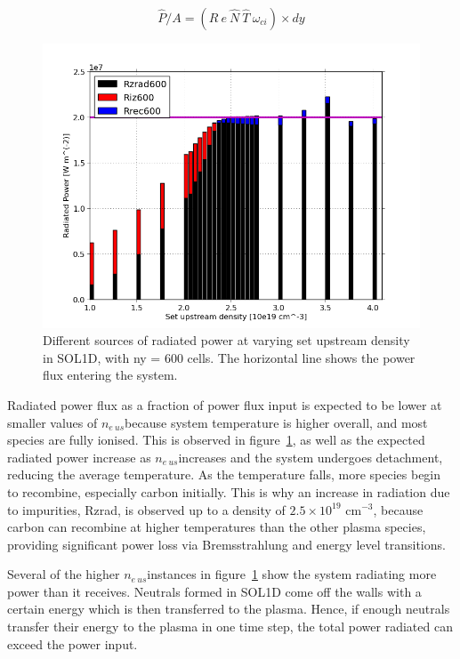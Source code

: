 \documentclass[11pt]{article}  %
\providecommand{\noNe}[1]{{${#1}\times 10^{19}$ cm$^{-3}$}} %
\providecommand{\neus}{$n_{e~us}$} %
\begin{document}
\begin{equation}\label{eqRpflux}
\hat{P}/A = (R~e~\hat{N}~\hat{T}~\omega_{ci}) \times dy
\end{equation}

\begin{figure}
\includegraphics[scale=0.5]{Figures/sol1d/PRbar600.png}
\centering
\caption{Different sources of radiated power at varying set upstream density in SOL1D, with ny = 600 cells. The horizontal line shows the power flux entering the system.}\label{figPRbar600}
\end{figure}

Radiated power flux as a fraction of power flux input is expected to be lower at smaller values of \neus because system temperature is higher overall, and most species are fully ionised. This is observed in figure~\ref{figPRbar600}, as well as the expected radiated power increase as \neus increases and the system undergoes detachment, reducing the average temperature. As the temperature falls, more species begin to recombine, especially carbon initially. This is why an increase in radiation due to impurities, Rzrad, is observed up to a density of \noNe{2.5}, because carbon can recombine at higher temperatures than the other plasma species, providing significant power loss via Bremsstrahlung and energy level transitions.

Several of the higher \neus instances in figure~\ref{figPRbar600} show the system radiating more power than it receives. Neutrals formed in SOL1D come off the walls with a certain energy which is then transferred to the plasma. Hence, if enough neutrals transfer their energy to the plasma in one time step, the total power radiated can exceed the power input.
\end{document}
